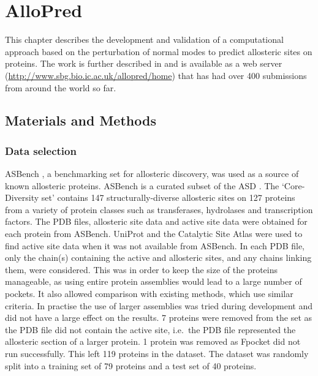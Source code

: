 \chapter{AlloPred}
\label{cha:allopred}

This chapter describes the development and validation of a computational approach based on the perturbation of normal modes to predict allosteric sites on proteins.
The work is further described in \cite{Greener2015} and is available as a web server (\url{http://www.sbg.bio.ic.ac.uk/allopred/home}) that has had over 400 submissions from around the world so far.


\section{Materials and Methods}
\label{sec:allopred_methods}

\subsection{Data selection}

ASBench \cite{Huang2015}, a benchmarking set for allosteric discovery, was used as a source of known allosteric proteins.
ASBench is a curated subset of the ASD \cite{Shen2016}.
The `Core-Diversity set' contains 147 structurally-diverse allosteric sites on 127 proteins from a variety of protein classes such as transferases, hydrolases and transcription factors.
The PDB files, allosteric site data and active site data were obtained for each protein from ASBench.
UniProt \cite{TheUniProtConsortium2015} and the Catalytic Site Atlas \cite{Furnham2014} were used to find active site data when it was not available from ASBench.
In each PDB file, only the chain(s) containing the active and allosteric sites, and any chains linking them, were considered.
This was in order to keep the size of the proteins manageable, as using entire protein assemblies would lead to a large number of pockets.
It also allowed comparison with existing methods, which use similar criteria.
In practise the use of larger assemblies was tried during development and did not have a large effect on the results.
7 proteins were removed from the set as the PDB file did not contain the active site, i.e.\ the PDB file represented the allosteric section of a larger protein.
1 protein was removed as Fpocket did not run successfully.
This left 119 proteins in the dataset.
The dataset was randomly split into a training set of 79 proteins and a test set of 40 proteins.


